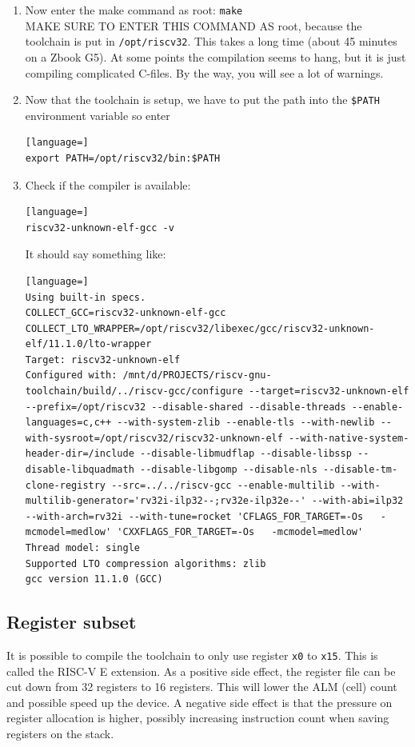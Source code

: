 \documentclass[12pt]{article}
\begin{document}
\begin{enumerate}
\item Now enter the make command as root: \lstinline|make|\\
MAKE SURE TO ENTER THIS COMMAND AS root, because the toolchain is put in \lstinline|/opt/riscv32|. This takes a long time (about 45 minutes on a Zbook G5). At some points the compilation seems to hang, but it is just compiling complicated C-files. By the way, you will see a lot of warnings.
\item Now that the toolchain is setup, we have to put the path into the \lstinline|$PATH| environment variable so enter
\begin{lstlisting}[language=]
export PATH=/opt/riscv32/bin:$PATH
\end{lstlisting}
\item Check if the compiler is available:
\begin{lstlisting}[language=]
riscv32-unknown-elf-gcc -v
\end{lstlisting}
It should say something like:
\begin{lstlisting}[language=]
Using built-in specs.
COLLECT_GCC=riscv32-unknown-elf-gcc
COLLECT_LTO_WRAPPER=/opt/riscv32/libexec/gcc/riscv32-unknown-elf/11.1.0/lto-wrapper
Target: riscv32-unknown-elf
Configured with: /mnt/d/PROJECTS/riscv-gnu-toolchain/build/../riscv-gcc/configure --target=riscv32-unknown-elf --prefix=/opt/riscv32 --disable-shared --disable-threads --enable-languages=c,c++ --with-system-zlib --enable-tls --with-newlib --with-sysroot=/opt/riscv32/riscv32-unknown-elf --with-native-system-header-dir=/include --disable-libmudflap --disable-libssp --disable-libquadmath --disable-libgomp --disable-nls --disable-tm-clone-registry --src=../../riscv-gcc --enable-multilib --with-multilib-generator='rv32i-ilp32--;rv32e-ilp32e--' --with-abi=ilp32 --with-arch=rv32i --with-tune=rocket 'CFLAGS_FOR_TARGET=-Os   -mcmodel=medlow' 'CXXFLAGS_FOR_TARGET=-Os   -mcmodel=medlow'
Thread model: single
Supported LTO compression algorithms: zlib
gcc version 11.1.0 (GCC) 
\end{lstlisting}
\end{enumerate}

\subsection{Register subset}
It is possible to compile the toolchain to only use register \texttt{x0} to \texttt{x15}. This is called the RISC-V E extension. As a positive side effect, the register file can be cut down from 32 registers to 16 registers. This will lower the ALM (cell) count and possible speed up the device. A negative side effect is that the pressure on register allocation is higher, possibly increasing instruction count when saving registers on the stack.
\end{document}
